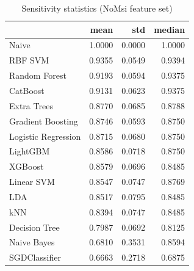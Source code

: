 \begin{table}
\caption{Sensitivity statistics (NoMsi feature set)}
\label{tab:sensitivity_NoMsi_stats}
\begin{tabular}{lrrr}
\toprule
 & mean & std & median \\
\midrule
Naive & 1.0000 & 0.0000 & 1.0000 \\
RBF SVM & 0.9355 & 0.0549 & 0.9394 \\
Random Forest & 0.9193 & 0.0594 & 0.9375 \\
CatBoost & 0.9131 & 0.0623 & 0.9375 \\
Extra Trees & 0.8770 & 0.0685 & 0.8788 \\
Gradient Boosting & 0.8746 & 0.0593 & 0.8750 \\
Logistic Regression & 0.8715 & 0.0680 & 0.8750 \\
LightGBM & 0.8586 & 0.0718 & 0.8750 \\
XGBoost & 0.8579 & 0.0696 & 0.8485 \\
Linear SVM & 0.8547 & 0.0747 & 0.8769 \\
LDA & 0.8517 & 0.0795 & 0.8485 \\
kNN & 0.8394 & 0.0747 & 0.8485 \\
Decision Tree & 0.7987 & 0.0692 & 0.8125 \\
Naive Bayes & 0.6810 & 0.3531 & 0.8594 \\
SGDClassifier & 0.6663 & 0.2718 & 0.6875 \\
\bottomrule
\end{tabular}
\end{table}
